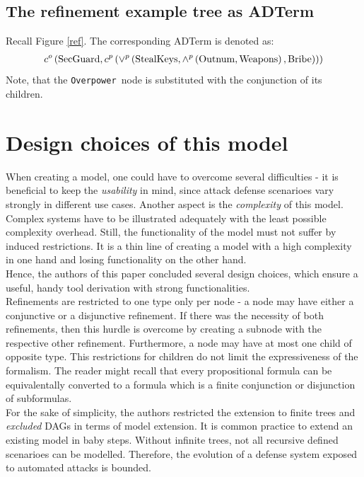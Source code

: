 \documentclass[conference]{IEEEtran}
\begin{document}
\subsection{The refinement example tree as ADTerm}
Recall Figure \ref{ref}. The corresponding ADTerm is denoted as:
\begin{align*}
\small
	c^o\left(\text{SecGuard}, c^p \left( \vee^p \left( \text{StealKeys}, \wedge^p \left( \text{Outnum},\text{Weapons} \right), \text{Bribe}  \right)  \right) \right)
\end{align*}
Note, that the \texttt{Overpower }node is substituted with the conjunction of its children. 
\section{Design choices of this model}
When creating a model, one could have to overcome several difficulties - it is beneficial to keep the \textit{usability} in mind, since attack defense scenarioes vary strongly in different use cases. Another aspect is the \textit{complexity }of this model. Complex systems have to be illustrated adequately with the least possible complexity overhead. Still, the functionality of the model must not suffer by induced restrictions. It is a thin line of creating a model with a high complexity in one hand and losing functionality on the other hand.\\Hence, the authors of this paper concluded several design choices, which ensure a useful, handy tool derivation with strong functionalities.\\
Refinements are restricted to one type only per node - a node may have either a conjunctive or a disjunctive refinement. If there was the necessity of both refinements, then this hurdle is overcome by creating a subnode with the respective other refinement. Furthermore, a node may have at most one child of opposite type. This restrictions for children do not limit the expressiveness of the formalism. The reader might recall that every propositional formula can be equivalentally converted to a formula which is a finite conjunction or disjunction of subformulas.\\
For the sake of simplicity, the authors restricted the extension to finite trees and \textit{excluded} DAGs in terms of model extension. It is common practice to extend an existing model in baby steps. Without infinite trees, not all recursive defined scenarioes can be modelled. Therefore, the evolution of a defense system exposed to automated attacks is bounded.
\end{document}
